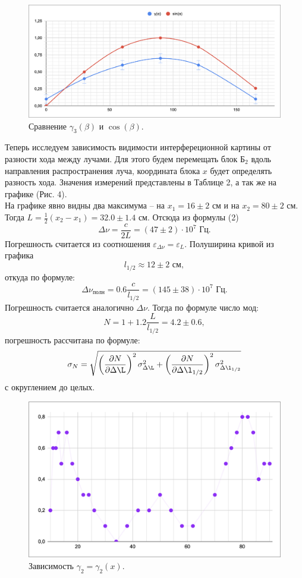 \documentclass[a4paper, 12pt]{article}%
\begin{document}
\begin{figure}[h]
\includegraphics[scale=0.6]{4.png}
\centering
\caption{Сравнение $\gamma_3(\beta)$ и $\cos(\beta)$.}
\end{figure}
\newpage
Теперь исследуем зависимость видимости интерфереционной картины от разности хода между лучами. Для этого будем перемещать блок $\text{Б}_2$ вдоль направления распространения луча, координата блока $x$ будет определять разность хода. Значения измерений представлены в Таблице 2, а так же на графике (Рис. 4).\\
На графике явно видны два максимума -- на $x_1 = 16\pm 2 \text{ см}$ и на $x_2 = 80 \pm 2 \text{ см}$. Тогда $L = \frac{1}{2}(x_2 - x_1) = 32.0 \pm 1.4 \text{ см}$. Отсюда из формулы (2)
$$
\Delta \nu = \dfrac{c}{2L} = (47 \pm 2) \cdot 10^7 \text{ Гц}.
$$
Погрешность считается из соотношения $\varepsilon_{\Delta\nu} = \varepsilon_{L}$. Полуширина кривой из графика
$$
l_{1/2} \approx 12 \pm 2 \text{ см},
$$
откуда по формуле:
$$
\Delta \nu_{\text{полн}} = 0.6\dfrac{c}{l_{1/2}} = (145 \pm 38) \cdot 10^7 \text{ Гц}.
$$
Погрешность считается аналогично $\Delta \nu$. Тогда по формуле число мод:
$$
N = 1 + 1.2\dfrac{L}{l_{1/2}} = 4.2 \pm 0.6, 
$$
погрешность рассчитана по формуле:
$$
\sigma_N = \sqrt{\left( \dfrac{\partial N}{\partial \Delta \L} \right)^2 \sigma^2_{\Delta \L} + \left( \dfrac{\partial N}{\partial \Delta \l_{1/2}} \right)^2 \sigma^2_{\Delta \l_{1/2}}}
$$
с округлением до целых.
\begin{figure}[h]
\includegraphics[scale=0.6]{5.png}
\centering
\caption{Зависимость $\gamma_2 = \gamma_2(x)$.}
\end{figure}
\end{document}
